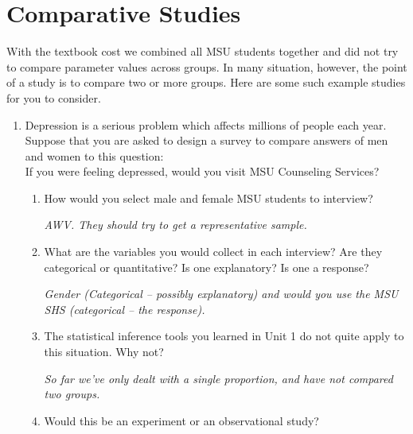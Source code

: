 \def\theTopic{Reading 10}

\section{ Comparative Studies}

  With the textbook cost we combined all MSU students together and did
  not try to compare parameter values across groups.  In many
  situation, however, the point of a study is to compare two or more
  groups. Here are some such example studies for you to consider. 

\begin{enumerate}
  \item  Depression is a serious problem which affects millions of
    people each year. Suppose that you are asked to 
    design a survey to compare answers of men and women to this question:\\
    {\sf If you were feeling depressed, would you visit MSU Counseling Services?}
    \begin{enumerate}
    \item How would you select male and female MSU students to
      interview?
\begin{students}
        \vfill
\end{students}
\begin{key}
 {\it AWV. They should try to get a representative sample.}
\end{key}
\item What are the variables you would collect in each interview?
      Are they categorical or quantitative? Is one explanatory? Is one a response?
\begin{students}
        \vfill
\end{students}
\begin{key}
 {\it Gender (Categorical -- possibly explanatory) and would you use
   the MSU SHS (categorical -- the response).}
\end{key}
    \item The statistical inference tools you learned in Unit 1 do not
      quite apply to this situation.  Why not? 
\begin{students}
        \vfill
\end{students}
\begin{key}
 {\it So far we've only dealt with a single proportion, and have not
   compared two groups. }
\end{key}
    \item Would this be an experiment or an observational study?

\end{enumerate}
\end{enumerate}
